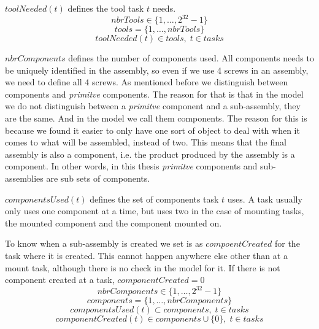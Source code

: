  $toolNeeded(t)$ defines the tool task $t$ needs.
 \begin{equation}\label{eq:3}
 nbrTools \in \{1 , \ldots , 2^{32}-1\}
 \end{equation}
 \begin{equation}\label{eq:12}
 tools = \{1 , \ldots , nbrTools\}
 \end{equation}
 \begin{equation}\label{eq:33}
 toolNeeded(t) \in tools, \; t \in tasks
 \end{equation} 

  \noindent $nbrComponents$ defines the number of components used. All components needs to be uniquely identified in the assembly, so even if we use 4 screws in an assembly, we need to define all 4 screws. As mentioned before we distinguish between components and \emph{primitve} components. The reason for that is that in the model we do not distinguish between a \emph{primitve} component and a sub-assembly, they are the same. And in the model we call them components. The reason for this is because we found it easier to only have one sort of object to deal with when it comes to what will be assembled, instead of two. This means that the final assembly is also a component, i.e. the product produced by the assembly is a component. In other words, in this thesis \emph{primitve} components and sub-assemblies are sub sets of components.
  
  $componentsUsed(t)$ defines the set of components task $t$ uses. A task usually only uses one component at a time, but uses two in the case of mounting tasks, the mounted component and the component mounted on.
  
  To know when a sub-assembly is created we set is as $compoentCreated$ for the task where it is created. This cannot happen anywhere else other than at a mount task, although there is no check in the model for it. If there is not component created at a task, $componentCreated=0$
 \begin{equation}\label{eq:6}
 nbrComponents \in \{1 , \ldots , 2^{32}-1\}
 \end{equation}
 \begin{equation}\label{eq:13}
 components = \{1 , \ldots , nbrComponents\}
 \end{equation}
 \begin{equation}\label{eq:25}
 componentsUsed(t) \subset components, \; t \in tasks
 \end{equation}
 \begin{equation}\label{eq:componentCreated}
 componentCreated(t) \in components \cup \{0\}, \; t \in tasks
 \end{equation}

